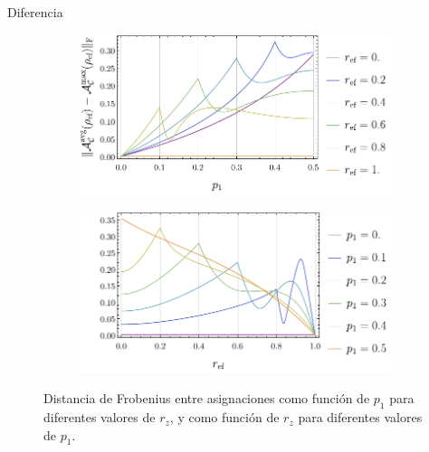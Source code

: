\begin{frame}{Diferencia}
    \begin{figure}
        \centering
        \begin{subfigure}{.45\textwidth}
          \centering
          \includegraphics[width=1.\linewidth]{figures/avg_results/dist_maxent_avg_vs_p.pdf}
        \end{subfigure}%
        \begin{subfigure}{.45\textwidth}
          \centering
          \includegraphics[width=1.\linewidth]{figures/avg_results/dist_maxent_avg_vs_z.pdf}
        \end{subfigure}
        \caption{Distancia de Frobenius entre asignaciones como función de $p_{1}$ para diferentes valores de $r_{z}$, y como función de $r_{z}$ para diferentes valores de $p_{1}$.}
    \end{figure}
\end{frame}

